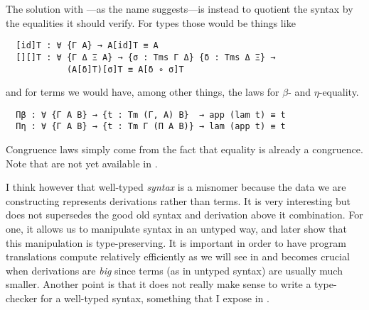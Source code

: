 The solution with ---as the name suggests---is instead to
quotient the syntax by the equalities it should verify.
For types those would be things like
\begin{verbatim}
  [id]T : ∀ {Γ A} → A[id]T ≡ A
  [][]T : ∀ {Γ Δ Ξ A} → {σ : Tms Γ Δ} {δ : Tms Δ Ξ} →
            (A[δ]T)[σ]T ≡ A[δ ∘ σ]T
\end{verbatim}
and for terms we would have, among other things, the laws for \(\beta\)- and
\(\eta\)-equality.
\begin{verbatim}
  Πβ : ∀ {Γ A B} → {t : Tm (Γ, A) B}  → app (lam t) ≡ t
  Πη : ∀ {Γ A B} → {t : Tm Γ (Π A B)} → lam (app t) ≡ t
\end{verbatim}
Congruence laws simply come from the fact that equality is already a congruence.
Note that  are not yet available in \Agda.

I think however that well-typed \emph{syntax} is a misnomer because the data we
are constructing represents derivations rather than terms.
It is very interesting but does not supersedes the good old syntax and
derivation above it combination.
For one, it allows us to manipulate syntax in an untyped way, and later show
that this manipulation is type-preserving. It is important in order to have
program translations compute relatively efficiently as we will see in
 and becomes crucial when derivations are
\emph{big} since terms (as in untyped syntax) are usually
much smaller. Another point is that it does not really make sense to write a
type-checker for a well-typed syntax, something that I expose in
.
